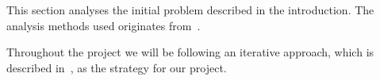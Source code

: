 This section analyses the initial problem described in the introduction. The analysis methods used originates from~\cite{mathiassen2001objektorienteret}. 

Throughout the project we will be following an iterative approach, which is described in~\cite{mathiassen2001objektorienteret}, as the strategy for our project.